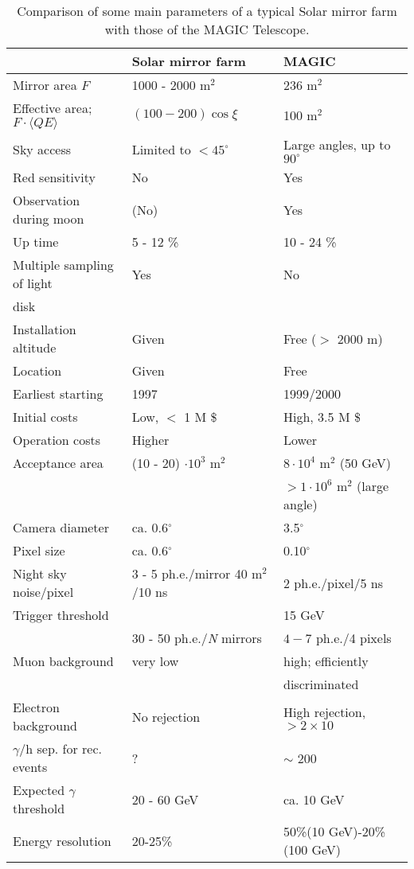 \begin{table} \centering
{\small
\begin{tabular}{|l|l|l|}
\hline
& Solar mirror farm & MAGIC \\ \hline\hline
Mirror area $F$ & 1000 - 2000 m$^{2}$ & 236 m$^{2}$ \\ \hline
Effective area; $F\cdot \langle QE\rangle $ & $(100-200)\cos \xi $%
\footnotemark  & 100 m$^{2}$ \\ \hline
Sky access & Limited to $<45^{\circ }$ & Large angles, up to $90^{\circ }$
\\ \hline
Red sensitivity & No & Yes \\ \hline
Observation during moon & (No) & Yes \\ \hline
Up time & 5 - 12 \% & 10 - 24 \% \\ \hline
Multiple sampling of light & Yes & No \\[-0.5ex]
disk &  &  \\ \hline
Installation altitude & Given & Free ($>$ 2000 m) \\ \hline
Location & Given & Free \\ \hline
Earliest starting & 1997 & 1999/2000 \\ \hline
Initial costs & Low, $<$ 1 M \$ & High, 3.5 M \$ \\ \hline
Operation costs & Higher & Lower \\ \hline
Acceptance area & (10 - 20) $\cdot 10^{3}$ m$^{2}$ & $8\cdot 10^{4}$ m$^{2}$
(50 GeV) \\[-0.5ex]
&  & $>1\cdot 10^{6}$ m$^{2}$ (large angle) \\ \hline
Camera diameter & ca. 0.6$^{\circ }$ & 3.5$^{\circ }$ \\ \hline
Pixel size & ca. 0.6$^{\circ }$ & 0.10$^{\circ }$ \\ \hline
Night sky noise/pixel & 3 - 5 ph.e./mirror 40 m$^{2}$/10 ns & 2
ph.e./pixel/5 ns \\ \hline
Trigger threshold &  & 15 GeV \\[-0.5ex]
& 30 - 50 ph.e./{\it N} mirrors & $4-7$ ph.e./4 pixels \\ \hline
Muon background & very low & high; efficiently \\[-0.5ex]
&  & discriminated \\ \hline
Electron background & No rejection & High rejection,  $> 2 \times 10$ \\ 
\hline
$\gamma$/h sep. for rec. events & ? & $\sim$ 200  \\ \hline
Expected $\gamma $ threshold & 20 - 60 GeV & ca. 10 GeV \\ \hline
Energy resolution & 20-25\% & 50\%(10 GeV)-20\%(100 GeV)\\ \hline
\end{tabular}
}
\caption{\label{tab-comparison}
Comparison of some main parameters of a typical Solar mirror
farm with those of the MAGIC Telescope.}
\end{table}

